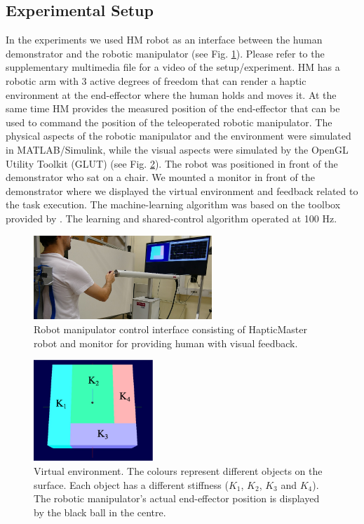 \subsection{Experimental Setup}
In the experiments we used HM robot as an interface between the human demonstrator and the robotic manipulator (see Fig. \ref{fig:setup}). Please refer to the supplementary multimedia file for a video of the setup/experiment. HM has a robotic arm with 3 active degrees of freedom that can render a haptic environment at the end-effector where the human holds and moves it. At the same time HM provides the measured position of the end-effector that can be used to command the position of the teleoperated robotic manipulator. The physical aspects of the robotic manipulator and the environment were simulated in MATLAB/Simulink, while the visual aspects were simulated by the OpenGL Utility Toolkit (GLUT) (see Fig. \ref{fig:surface}). The robot was positioned in front of the demonstrator who sat on a chair. We mounted a monitor in front of the demonstrator where we displayed the virtual environment and feedback related to the task execution. The machine-learning algorithm was based on the toolbox provided by \cite{Klanke2008}. The learning and shared-control algorithm operated at 100 Hz.
\begin{figure}[!t]
  \centering
  \includegraphics[width=0.6\textwidth]{Luka/setup.jpg}
  \caption{Robot manipulator control interface consisting of HapticMaster robot and monitor for providing human with visual feedback.}
  \label{fig:setup}
  \vspace{-2 mm}
\end{figure}
\begin{figure}[!t]
  \centering
  \includegraphics[width=0.4\textwidth]{Luka/env.eps}
  \caption{Virtual environment. The colours represent different objects on the surface. Each object has a different stiffness ($K_1$, $K_2$, $K_3$ and $K_4$). The robotic manipulator's actual end-effector position is displayed by the black ball in the centre.}
  \label{fig:surface}
  \vspace{-4 mm}
\end{figure}

